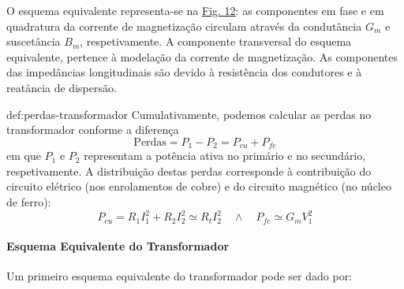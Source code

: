 O esquema equivalente representa-se na \hyperref[fig:esquema-equiv-transformador]{Fig. 12}: as componentes em fase e em quadratura da corrente de magnetização circulam através da condutância $G_m$ e suscetância $B_m$, respetivamente. A componente transversal do esquema equivalente, pertence à modelação da corrente de magnetização. As componentes das impedâncias longitudinais são devido à resistência dos condutores e à reatância de dispersão. 

\vspace{-0.5em}
\begin{theo}{def:perdas-transformador}
    Cumulativamente, podemos calcular as perdas no transformador conforme a diferença
    $$
        \text{Perdas} = P_1 - P_2 = P_{cu} + P_{fe}
    $$
    em que $P_1$ e $P_2$ representam a potência ativa no primário e no secundário, respetivamente. A distribuição destas perdas corresponde à contribuição do circuito elétrico (nos enrolamentos de cobre) e do circuito magnético (no núcleo de ferro):
    $$
        P_{cu} = R_1 I_1^2 + R_2 I_2^2 \simeq R_t I_2^2 \quad\land\quad P_{fe} \simeq G_m V_1^2
    $$
\end{theo}

\clearpage
\paragraph{Esquema Equivalente do Transformador}
\label{subsubsec:equiv-esquema}

Um primeiro esquema equivalente do transformador pode ser dado por:

